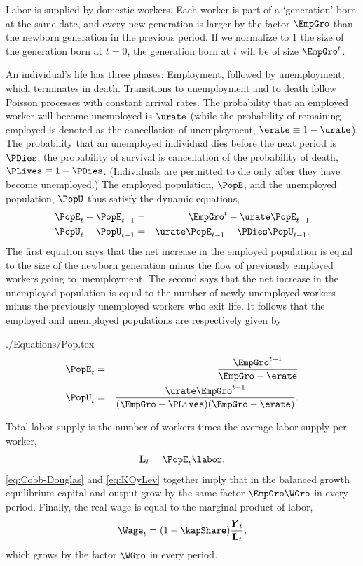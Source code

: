 \documentclass[titlepage]{\econtex}\newcommand{\texname}{cjSOE}
\renewcommand{\GDPLev}{\ensuremath{\pmb{Y}}}
\begin{document}
Labor is supplied by domestic workers. Each worker is part of a `generation' born at the same date, and every new generation is larger by the factor $\EmpGro$ than the newborn generation in the previous period. If we normalize to 1 the size of the generation born at $t=0$, the generation born at $t$ will be of size $\EmpGro^t$.

An individual's life has three phases: Employment, followed by
unemployment, which terminates in death. Transitions to unemployment
and to death follow Poisson processes with constant arrival rates. The
probability that an employed worker will become unemployed is $\urate$
(while the probability of remaining employed is denoted as the cancellation of unemployment, $\erate \equiv 1-\urate$).
The probability that an unemployed individual dies before the next
period is $\PDies$; the probability of survival is
cancellation of the probability of death, $\PLives \equiv 1-\PDies$. (Individuals are
permitted to die only after they have become unemployed.) The employed
population, $\PopE$, and the unemployed population, $\PopU$ thus
satisfy the dynamic equations,
\begin{eqnarray*}
  \PopE_t - \PopE_{t-1} & = & \EmpGro^t-\urate \PopE_{t-1}
\\  \PopU_t - \PopU_{t-1} & = &\urate \PopE_{t-1} - \PDies \PopU_{t-1}.
\end{eqnarray*}
The first equation says that the net increase in the employed population is equal to the size of the newborn generation minus the flow of previously employed workers going to unemployment. The second says that the net increase in the unemployed population is equal to the number of newly unemployed workers minus the previously unemployed workers who exit life. It follows that the employed and unemployed populations are respectively given by
\begin{verbatimwrite}{./Equations/Pop.tex}
\begin{eqnarray*}
\PopE_t & = & \frac{\EmpGro^{t+1}}{\EmpGro-\erate} \label{eq:PopEt}
\\ \PopU_t & = & \frac{\urate \EmpGro^{t+1}}{(\EmpGro-\PLives)(\EmpGro-\erate)}. \label{eq:PopUt}
\end{eqnarray*} %
\end{verbatimwrite}


Total labor supply is the number of workers times the average labor supply per worker,
\begin{equation}
\LLev_t = \PopE_t \labor.
\label{eq:Lt}
\end{equation}
\eqref{eq:Cobb-Douglas} and \eqref{eq:KOyLev} together imply that in
the balanced growth equilibrium capital and output grow by the same
factor $\EmpGro \WGro$ in every period.  Finally, the real wage is
equal to the marginal product of labor,
\begin{equation*}
\Wage_t =(1-\kapShare)\frac{\GDPLev_t}{\LLev_t},
\end{equation*}
which grows by the factor $\WGro$ in every period.
\end{document}
